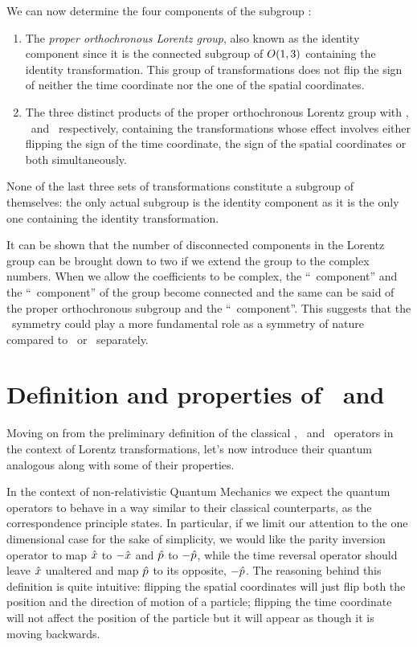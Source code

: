         We can now determine the four components of the subgroup \cite{bender2024}:
        \begin{enumerate}[label = \mybullet]
            \item The \emph{proper orthochronous Lorentz group}, also known as the identity component since it is the connected subgroup of $O\pqty{1,3}$ containing the identity transformation. This group of transformations does not flip the sign of neither the time coordinate nor the one of the spatial coordinates.
            \item The three distinct products of the proper orthochronous Lorentz group with \mcP, \mcT\ and \PT\ respectively, containing the transformations whose effect involves either flipping the sign of the time coordinate, the sign of the spatial coordinates or both simultaneously.
        \end{enumerate}
        None of the last three sets of transformations constitute a subgroup of themselves: the only actual subgroup is the identity component as it is the only one containing the identity transformation.
        
        It can be shown \cite{bender2024} that the number of disconnected components in the Lorentz group can be brought down to two if we extend the group to the complex numbers. When we allow the coefficients to be complex, the ``\mcP\ component'' and the ``\mcT\ component'' of the group become connected and the same can be said of the proper orthochronous subgroup and the ``\PT\ component''. This suggests that the \PT\ symmetry could play a more fundamental role as a symmetry of nature compared to \mcP\ or \mcT\ separately.
    
    \section{Definition and properties of \hP\ and \hT}\label{s:def-of-P-and-T}
        Moving on from the preliminary definition of the classical \mcP, \mcT\ and \PT\ operators in the context of Lorentz transformations, let's now introduce their quantum analogous along with some of their properties.

        In the context of non-relativistic Quantum Mechanics we expect the quantum operators to behave in a way similar to their classical counterparts, as the correspondence principle states. In particular, if we limit our attention to the one dimensional case for the sake of simplicity, we would like the parity inversion operator to map $\hat{x}$ to $-\hat{x}$ and $\hat{p}$ to $-\hat{p}$, while the time reversal operator should leave $\hat{x}$ unaltered and map $\hat{p}$ to its opposite, $-\hat{p}$. The reasoning behind this definition is quite intuitive: flipping the spatial coordinates will just flip both the position and the direction of motion of a particle; flipping the time coordinate will not affect the position of the particle but it will appear as though it is moving backwards.


